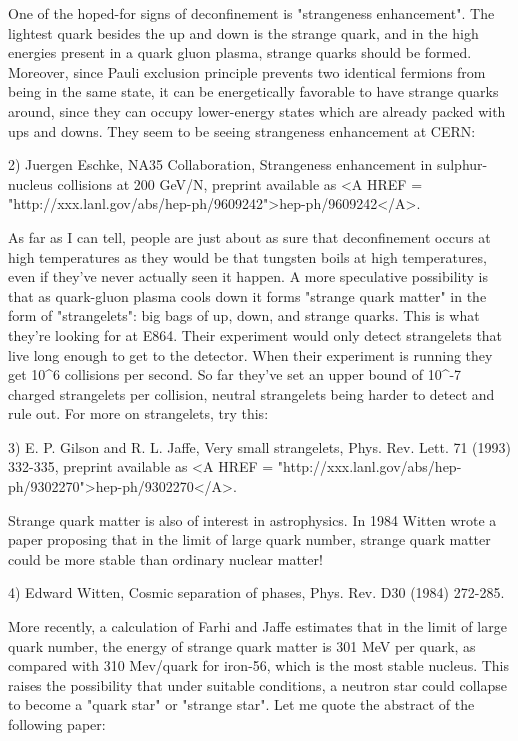 One of the hoped-for signs of deconfinement is "strangeness enhancement".
The lightest quark besides the up and down is the strange quark, and in
the high energies present in a quark gluon plasma, strange quarks should
be formed.  Moreover, since Pauli exclusion principle prevents two identical
fermions from being in the same state, it can be energetically favorable 
to have strange quarks around, since they can occupy lower-energy states 
which are already packed with ups and downs.  They seem to be seeing
strangeness enhancement at CERN:

2) Juergen Eschke, NA35 Collaboration, Strangeness enhancement in sulphur-
nucleus collisions at 200 GeV/N, preprint available as
<A HREF = "http://xxx.lanl.gov/abs/hep-ph/9609242">hep-ph/9609242</A>.

As far as I can tell, people are just about as sure that deconfinement 
occurs at high temperatures as they would be that tungsten boils at
high temperatures, even if they've never actually seen it happen.  A 
more speculative possibility is that as quark-gluon plasma cools down 
it forms "strange quark matter" in the form of 
"strangelets": big bags of 
up, down, and strange quarks.  This is what they're looking for at E864.  
Their experiment would only detect strangelets that live long enough 
to get to the detector.  When their experiment is running they get 10^6 
collisions per second.  So far they've set an upper bound of 10^{-7} 
charged strangelets per collision, neutral strangelets being harder to 
detect and rule out.  For more on strangelets, try this:

3) E. P. Gilson and R. L. Jaffe, Very small strangelets, Phys. Rev. Lett. 
71 (1993) 332-335, preprint available as
<A HREF = "http://xxx.lanl.gov/abs/hep-ph/9302270">hep-ph/9302270</A>.

Strange quark matter is also of interest in astrophysics.  In 1984 
Witten wrote a paper proposing that in the limit of large quark number, 
strange quark matter could be more stable than ordinary nuclear matter!

4) Edward Witten, Cosmic separation of phases, Phys. Rev. D30 (1984) 
272-285.

More recently, a calculation of Farhi and Jaffe estimates that in
the limit of large quark number, the energy of strange quark matter is
301 MeV per quark, as compared with 310 Mev/quark for iron-56, which
is the most stable nucleus.   This raises the possibility that under 
suitable conditions, a neutron star could collapse to become a "quark
star" or "strange star".  Let me quote the abstract of the following
paper:

